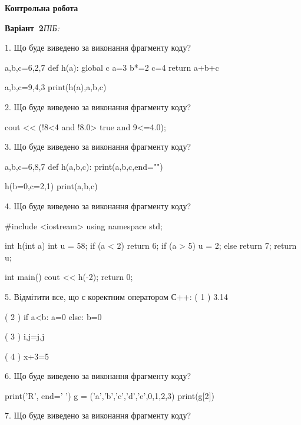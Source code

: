 \documentclass[11pt]{article}
\begin{document}
{\large\textbf{Контрольна робота}}

\textbf{Варіант \No\,2}\hfill \textit{ПІБ:}\,\underline{\hspace{60mm}}
\vspace{4mm}

1. Що буде виведено за виконання фрагменту коду?

a,b,c=6,2,7
def h(a):
global c    a=3
    b*=2
    c=4
    return a+b+c

a,b,c=9,4,3
print(h(a),a,b,c)
\vspace{5mm}

2. Що буде виведено за виконання фрагменту коду?

cout << (!8<4 and !8.0> true and 9<=4.0);
\vspace{5mm}

3. Що буде виведено за виконання фрагменту коду?

a,b,c=6,8,7
def h(a,b,c):
    print(a,b,c,end="")

h(b=0,c=2,1)
print(a,b,c)

\vspace{5mm}

4. Що буде виведено за виконання фрагменту коду?

#include <iostream>
using namespace std;

int h(int a){
    int u = 58;
    if (a < 2) 
        return 6;
    if (a > 5)
         u = 2;
    else
         return 7;
    return u;
}

int main(){
    cout << h(-2);
    return 0;
}

\vspace{5mm}

5. %
Відмітити все, що є коректним оператором С++:
( 1 ) 3.14%

( 2 ) if a<b: a=0 else: b=0

( 3 ) i,j=j,j

( 4 ) x+3=5
\vspace{5mm}

6. Що буде виведено за виконання фрагменту коду?

print('R', end=' ')
g = ('a','b','c','d','e',0,1,2,3)
print(g[2])

\vspace{5mm}

7. Що буде виведено за виконання фрагменту коду?
\end{document}
